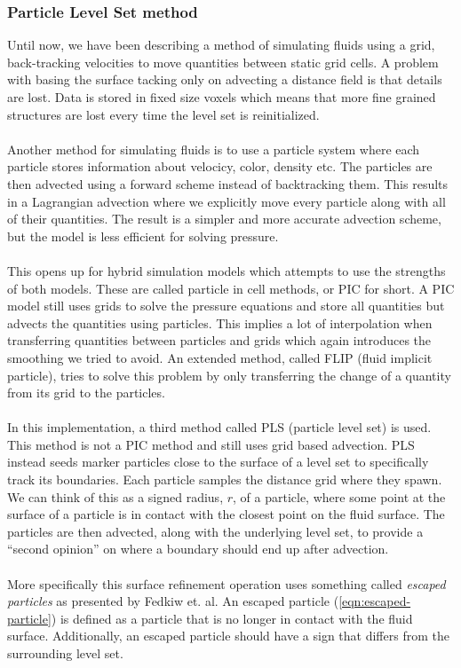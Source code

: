 \documentclass[twocolumn]{article}
\begin{document}
\subsubsection{Particle Level Set method}
Until now, we have been describing a method of simulating fluids using a grid, back-tracking velocities to move quantities between static grid cells. A problem with basing the surface tacking only on advecting a distance field is that details are lost. Data is stored in fixed size voxels which means that more fine grained structures are lost every time the level set is reinitialized. 
\\\\
Another method for simulating fluids is to use a particle system where each particle stores information about velocicy, color, density etc. The particles are then advected using a forward scheme instead of backtracking them. This results in a Lagrangian advection where we explicitly move every particle along with all of their quantities. The result is a simpler and more accurate advection scheme, but the model is less efficient for solving pressure.
\\\\
This opens up for hybrid simulation models which attempts to use the strengths of both models. These are called particle in cell methods, or PIC for short. A PIC model still uses grids to solve the pressure equations and store all quantities but advects the quantities using particles. This implies a lot of interpolation when transferring quantities between particles and grids which again introduces the smoothing we tried to avoid. An extended method, called FLIP (fluid implicit particle), tries to solve this problem by only transferring the change of a quantity from its grid to the particles.
\\\\
In this implementation, a third method called PLS (particle level set) is used. This method is not a PIC method and still uses grid based advection. PLS instead seeds marker particles close to the surface of a level set to specifically track its boundaries. Each particle samples the distance grid where they spawn. We can think of this as a signed radius, $r$, of a particle, where some point at the surface of a particle is in contact with the closest point on the fluid surface. The particles are then advected, along with the underlying level set, to provide a ``second opinion'' on where a boundary should end up after advection.
\\\\
More specifically this surface refinement operation uses something called \emph{escaped particles} as presented by Fedkiw et. al\cite{particleLevelSet}. An escaped particle (\ref{eqn:escaped-particle}) is defined as a particle that is no longer in contact with the fluid surface. Additionally, an escaped particle should have a sign that differs from the surrounding level set.
\end{document}
